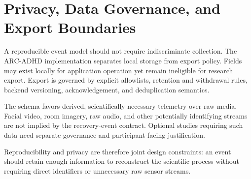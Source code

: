 \section{Privacy, Data Governance, and Export Boundaries}

A reproducible event model should not require indiscriminate collection. The ARC-ADHD implementation separates local storage from export policy. Fields may exist locally for application operation yet remain ineligible for research export. Export is governed by explicit allowlists, retention and withdrawal rules, backend versioning, acknowledgement, and deduplication semantics.

The schema favors derived, scientifically necessary telemetry over raw media. Facial video, room imagery, raw audio, and other potentially identifying streams are not implied by the recovery-event contract. Optional studies requiring such data need separate governance and participant-facing justification.

Reproducibility and privacy are therefore joint design constraints: an event should retain enough information to reconstruct the scientific process without requiring direct identifiers or unnecessary raw sensor streams.
